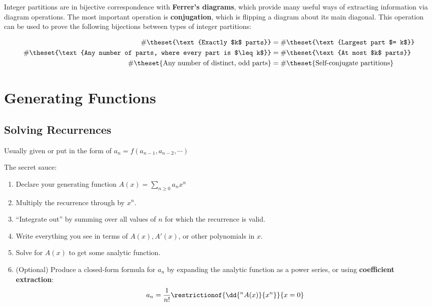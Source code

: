 Integer partitions are in bijective correspondence with \textbf{Ferrer's
diagrams}, which provide many useful ways of extracting information via
diagram operations. The most important operation is
\textbf{conjugation}, which is flipping a diagram about its main
diagonal. This operation can be used to prove the following bijections
between types of integer partitions:

\[\begin{aligned}
\#\theset{\text{Exactly $k$ parts}} &= \#\theset{\text{Largest part $= k$}}\\
\#\theset{\text{Any number of parts, where every part is $\leq k$}} &= \#\theset{\text{At most $k$ parts}} \\
\#\theset{\text{Any number of distinct, odd parts}} &= \#\theset{\text{Self-conjugate partitions}}
\end{aligned}\]

\hypertarget{generating-functions}{%
\section{Generating Functions}\label{generating-functions}}

\hypertarget{solving-recurrences}{%
\subsection{Solving Recurrences}\label{solving-recurrences}}

Usually given or put in the form of
\(a_n = f(a_{n-1}, a_{n-2}, \cdots)\)

The secret sauce:

\begin{enumerate}
\def\labelenumi{\arabic{enumi}.}
\tightlist
\item
  Declare your generating function
  \(A(x) = \displaystyle\sum_{n\geq 0} a_n x^n\)
\item
  Multiply the recurrence through by \(x^n\).
\item
  ``Integrate out'' by summing over all values of \(n\) for which the
  recurrence is valid.
\item
  Write everything you see in terms of \(A(x), A'(x)\), or other
  polynomials in \(x\).
\item
  Solve for \(A(x)\) to get some analytic function.
\item
  (Optional) Produce a closed-form formula for \(a_n\) by expanding the
  analytic function as a power series, or using \textbf{coefficient
  extraction}: \[
  a_n = \frac{1}{n!} \restrictionof{\dd{^n A(x)}{x^n}}{x=0}
  \]
\end{enumerate}

